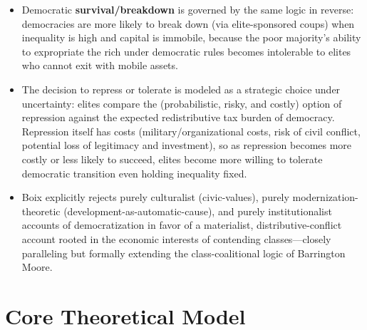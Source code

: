 \documentclass[12pt]{article}
\begin{document}
\begin{itemize}[leftmargin=*, itemsep=4pt]
    \item Democratic \textbf{survival/breakdown} is governed by the same logic in reverse: democracies are more likely to break down (via elite-sponsored coups) when inequality is high and capital is immobile, because the poor majority's ability to expropriate the rich under democratic rules becomes intolerable to elites who cannot exit with mobile assets.
    \item The decision to repress or tolerate is modeled as a strategic choice under uncertainty: elites compare the (probabilistic, risky, and costly) option of repression against the expected redistributive tax burden of democracy. Repression itself has costs (military/organizational costs, risk of civil conflict, potential loss of legitimacy and investment), so as repression becomes more costly or less likely to succeed, elites become more willing to tolerate democratic transition even holding inequality fixed.
    \item Boix explicitly rejects purely culturalist (civic-values), purely modernization-theoretic (development-as-automatic-cause), and purely institutionalist accounts of democratization in favor of a materialist, distributive-conflict account rooted in the economic interests of contending classes---closely paralleling but formally extending the class-coalitional logic of Barrington Moore.
\end{itemize}

\section{Core Theoretical Model}
\end{document}
